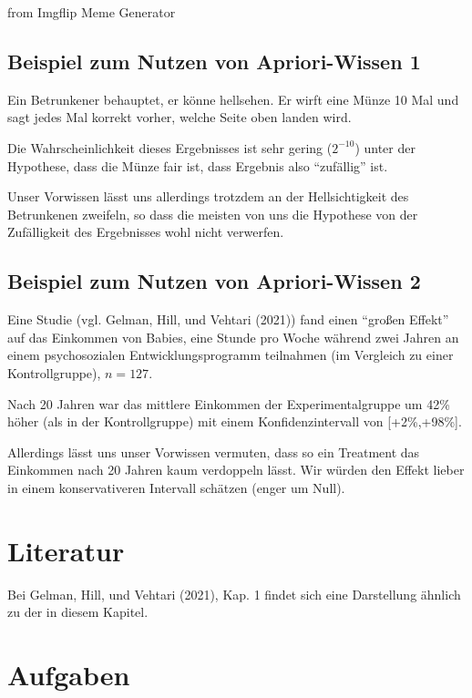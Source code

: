 \documentclass[
  a4paper,
  DIV=11]{scrreprt}
\theoremstyle{definition}
\theoremstyle{remark}
\begin{document}
from Imgflip Meme Generator

\hypertarget{beispiel-zum-nutzen-von-apriori-wissen-1}{%
\subsection{Beispiel zum Nutzen von Apriori-Wissen
1}\label{beispiel-zum-nutzen-von-apriori-wissen-1}}

Ein Betrunkener behauptet, er könne hellsehen. Er wirft eine Münze 10
Mal und sagt jedes Mal korrekt vorher, welche Seite oben landen wird.

Die Wahrscheinlichkeit dieses Ergebnisses ist sehr gering (\(2^{-10}\))
unter der Hypothese, dass die Münze fair ist, dass Ergebnis also
``zufällig'' ist.

Unser Vorwissen lässt uns allerdings trotzdem an der Hellsichtigkeit des
Betrunkenen zweifeln, so dass die meisten von uns die Hypothese von der
Zufälligkeit des Ergebnisses wohl nicht verwerfen.

\hypertarget{beispiel-zum-nutzen-von-apriori-wissen-2}{%
\subsection{Beispiel zum Nutzen von Apriori-Wissen
2}\label{beispiel-zum-nutzen-von-apriori-wissen-2}}

Eine Studie (vgl. Gelman, Hill, und Vehtari (2021)) fand einen ``großen
Effekt'' auf das Einkommen von Babies, eine Stunde pro Woche während
zwei Jahren an einem psychosozialen Entwicklungsprogramm teilnahmen (im
Vergleich zu einer Kontrollgruppe), \(n=127\).

Nach 20 Jahren war das mittlere Einkommen der Experimentalgruppe um 42\%
höher (als in der Kontrollgruppe) mit einem Konfidenzintervall von
{[}+2\%,+98\%{]}.

Allerdings lässt uns unser Vorwissen vermuten, dass so ein Treatment das
Einkommen nach 20 Jahren kaum verdoppeln lässt. Wir würden den Effekt
lieber in einem konservativeren Intervall schätzen (enger um Null).

\hypertarget{literatur-1}{%
\section{Literatur}\label{literatur-1}}

Bei Gelman, Hill, und Vehtari (2021), Kap. 1 findet sich eine
Darstellung ähnlich zu der in diesem Kapitel.

\hypertarget{aufgaben}{%
\section{Aufgaben}\label{aufgaben}}
\end{document}
